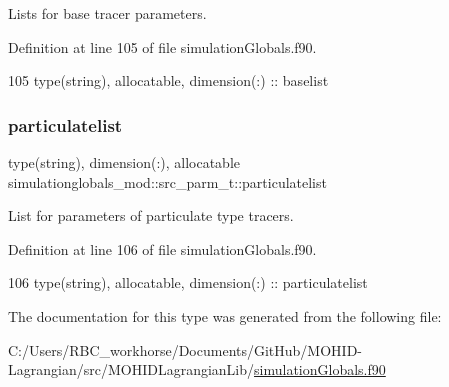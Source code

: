 Lists for base tracer parameters. 



Definition at line 105 of file simulation\+Globals.\+f90.


\begin{DoxyCode}
105         \textcolor{keywordtype}{type}(string), \textcolor{keywordtype}{allocatable}, \textcolor{keywordtype}{dimension(:)} :: baselist
\end{DoxyCode}
\mbox{\label{structsimulationglobals__mod_1_1src__parm__t_acc2c392a2031552a1f44336a4ca96873}} 
\subsubsection{\texorpdfstring{particulatelist}{particulatelist}}
{\footnotesize\ttfamily type(string), dimension(\+:), allocatable simulationglobals\+\_\+mod\+::src\+\_\+parm\+\_\+t\+::particulatelist\hspace{0.3cm}{\ttfamily [private]}}



List for parameters of particulate type tracers. 



Definition at line 106 of file simulation\+Globals.\+f90.


\begin{DoxyCode}
106         \textcolor{keywordtype}{type}(string), \textcolor{keywordtype}{allocatable}, \textcolor{keywordtype}{dimension(:)} :: particulatelist
\end{DoxyCode}


The documentation for this type was generated from the following file\+:\begin{DoxyCompactItemize}
\item 
C\+:/\+Users/\+R\+B\+C\+\_\+workhorse/\+Documents/\+Git\+Hub/\+M\+O\+H\+I\+D-\/\+Lagrangian/src/\+M\+O\+H\+I\+D\+Lagrangian\+Lib/\mbox{\hyperlink{simulation_globals_8f90}{simulation\+Globals.\+f90}}\end{DoxyCompactItemize}
